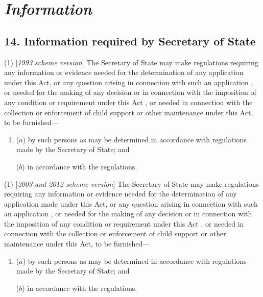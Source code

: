 \documentclass[12pt,a4paper]{article}
\begin{document}
\section{\itshape Information}

\subsection{14. Information required by 
Secretary of State  %
}

(1) [\emph{1993 scheme version}] The Secretary of State may make regulations requiring any information or evidence needed for the determination of any application under this Act, or any question arising in connection with such an application%
, or needed for the making of any decision or in connection with the imposition of any condition or requirement under this Act%
, or needed in connection with the collection or enforcement of child support or other maintenance under this Act, to be furnished—
\begin{enumerate}\item[]
($a$) by such persons as may be determined in accordance with regulations made by the Secretary of State; and

($b$) in accordance with the regulations.
\end{enumerate}

(1) [\emph{2003 and 2012 scheme version}] The Secretary of State may make regulations requiring any information or evidence needed for the determination of any application 
made 
under this Act, or any question arising in connection with such an application%
, or needed for the making of any decision or in connection with the imposition of any condition or requirement under this Act%
, or needed in connection with the collection or enforcement of child support or other maintenance under this Act, to be furnished—
\begin{enumerate}\item[]
($a$) by such persons as may be determined in accordance with regulations made by the Secretary of State; and

($b$) in accordance with the regulations.
\end{enumerate}
\end{document}
